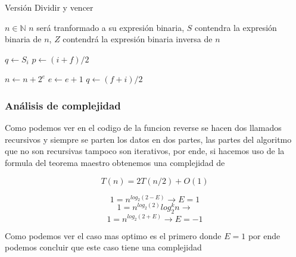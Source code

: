 \documentclass[letter]{article}
\begin{document}
\begin{algorithm}[!htb]
\caption{Versión Dividir y vencer}
\begin{algorithmic}[1]
\Require $n \in \mathbb{N}$
\Ensure $n$ será tranformado a su expresión binaria, $S$ contendra la expresión binaria de $n$, $Z$ contendrá la expresión binaria inversa de $n$ 
    \State {}
    \State {}
  \EndIf
\EndProcedure\\
\end{algorithmic}


\begin{algorithmic}[1]
  \State $q \leftarrow S_i$
  \State {}
  \EndIf
  \State $p \leftarrow (i+f)/2$
  \State {}
  \State {}
  \EndIf
\EndProcedure\\
\end{algorithmic}

\begin{algorithmic}[1]
        \State $n\leftarrow n+2^e$
    \EndIf
    \State $e\leftarrow e+1$
        \State $q \leftarrow (f+i)/2$
        \State {}
        \State {}
    \EndIf
\EndIf
\EndProcedure
\end{algorithmic}

\end{algorithm}

\subsubsection{Análisis de complejidad} \label{algoritmos:recursivo:complejidad}

Como podemos ver en el codigo de la funcion reverse se hacen dos llamados recursivos y siempre se parten los datos en dos partes, las partes del algoritmo que no son recursivas tampoco son iterativos, por ende, si hacemos uso de la formula del teorema maestro obtenemos una complejidad de

\[T(n)= 2T(n/2)+O(1) \]

\[1= n^{log_2(2-E)} \rightarrow E=1\]
\[1= n^{log_2(2)}log_2^kn \rightarrow \]
\[1= n^{log_2(2+E)} \rightarrow E=-1\]

Como podemos ver el caso mas optimo es el primero donde $E = 1$ por ende podemos concluir que este caso tiene una complejidad
\end{document}
